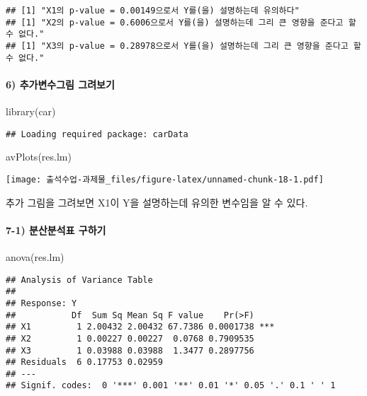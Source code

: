 \documentclass[
]{article}
\newenvironment{Shaded}{\begin{snugshade}}{\end{snugshade}}
\newcommand{\FunctionTok}[1]{\textcolor[rgb]{0.00,0.00,0.00}{#1}}
\newcommand{\NormalTok}[1]{#1}
\begin{document}
\begin{verbatim}
## [1] "X1의 p-value = 0.00149으로서 Y를(을) 설명하는데 유의하다"
## [1] "X2의 p-value = 0.6006으로서 Y를(을) 설명하는데 그리 큰 영향을 준다고 할 수 없다."
## [1] "X3의 p-value = 0.28978으로서 Y를(을) 설명하는데 그리 큰 영향을 준다고 할 수 없다."
\end{verbatim}

\hypertarget{uxcd94uxac00uxbcc0uxc218uxadf8uxb9bc-uxadf8uxb824uxbcf4uxae30}{%
\paragraph{6) 추가변수그림
그려보기}\label{uxcd94uxac00uxbcc0uxc218uxadf8uxb9bc-uxadf8uxb824uxbcf4uxae30}}

\begin{Shaded}
\begin{Highlighting}[]
\FunctionTok{library}\NormalTok{(car)}
\end{Highlighting}
\end{Shaded}

\begin{verbatim}
## Loading required package: carData
\end{verbatim}

\begin{Shaded}
\begin{Highlighting}[]
\FunctionTok{avPlots}\NormalTok{(res.lm)}
\end{Highlighting}
\end{Shaded}

\texttt{[image: 출석수업-과제물\_files/figure-latex/unnamed-chunk-18-1.pdf]}

추가 그림을 그려보면 X1이 Y을 설명하는데 유의한 변수임을 알 수 있다.

\hypertarget{uxbd84uxc0b0uxbd84uxc11duxd45c-uxad6cuxd558uxae30}{%
\paragraph{7-1) 분산분석표
구하기}\label{uxbd84uxc0b0uxbd84uxc11duxd45c-uxad6cuxd558uxae30}}

\begin{Shaded}
\begin{Highlighting}[]
\FunctionTok{anova}\NormalTok{(res.lm)}
\end{Highlighting}
\end{Shaded}

\begin{verbatim}
## Analysis of Variance Table
## 
## Response: Y
##           Df  Sum Sq Mean Sq F value    Pr(>F)    
## X1         1 2.00432 2.00432 67.7386 0.0001738 ***
## X2         1 0.00227 0.00227  0.0768 0.7909535    
## X3         1 0.03988 0.03988  1.3477 0.2897756    
## Residuals  6 0.17753 0.02959                      
## ---
## Signif. codes:  0 '***' 0.001 '**' 0.01 '*' 0.05 '.' 0.1 ' ' 1
\end{verbatim}
\end{document}
